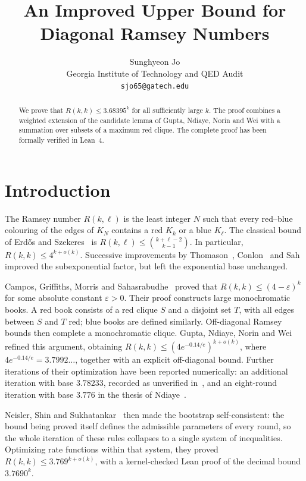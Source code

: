 \documentclass[11pt]{article}
\title{An Improved Upper Bound for Diagonal Ramsey Numbers}
\author{%
 Sunghyeon Jo\\
 {\small Georgia Institute of Technology and QED Audit}\\
 {\small\texttt{sjo65@gatech.edu}}
}
\date{}
\theoremstyle{definition}
\theoremstyle{remark}
\numberwithin{equation}{section}
\begin{document}
\maketitle

\begin{abstract}
We prove that $R(k,k)\le 3.68395^k$ for all sufficiently large $k$.
The proof combines a weighted extension of the candidate lemma of
Gupta, Ndiaye, Norin and Wei with a summation over subsets of a
maximum red clique.
The complete proof has been formally verified in Lean~4.
\end{abstract}

\section{Introduction}

The Ramsey number $R(k,\ell)$ is the least integer $N$ such that every
red--blue colouring of the edges of $K_N$ contains a red $K_k$ or a blue
$K_\ell$. The classical bound of Erd\H{o}s and Szekeres~\cite{ES} is
$R(k,\ell)\le\binom{k+\ell-2}{k-1}$. In particular,
$R(k,k)\le 4^{k+o(k)}$. Successive improvements by
Thomason~\cite{Thomason}, Conlon~\cite{Conlon} and Sah~\cite{Sah}
improved the subexponential factor, but left the exponential base
unchanged.

Campos, Griffiths, Morris and Sahasrabudhe~\cite{CGMS} proved that
$R(k,k)\le(4-\varepsilon)^k$ for some absolute constant
$\varepsilon>0$. Their proof constructs large monochromatic books.
A red book consists of a red clique $S$ and a disjoint set $T$, with
all edges between $S$ and $T$ red; blue books are defined similarly.
Off-diagonal Ramsey bounds then complete a monochromatic clique.
Gupta, Ndiaye, Norin and Wei~\cite{GNNW} refined this argument, obtaining
$R(k,k)\le(4e^{-0.14/e})^{k+o(k)}$, where
$4e^{-0.14/e}=3.7992\ldots$, together with an explicit off-diagonal
bound. Further iterations of their optimization have been reported
numerically: an additional iteration with base $3.78233$, recorded as
unverified in~\cite[Remark~17]{GNNW}, and an eight-round iteration
with base $3.776$ in the thesis of Ndiaye~\cite{NdiayeThesis}.

Neisler, Shin and Sukhatankar~\cite{NSS} then made the bootstrap
self-consistent: the bound being proved itself defines the admissible
parameters of every round, so the whole iteration of these rules
collapses to a single system of inequalities. Optimizing
rate functions within that system, they proved
$R(k,k)\le3.769^{k+o(k)}$, with a kernel-checked Lean proof of the
decimal bound $3.7690^k$.
\end{document}
